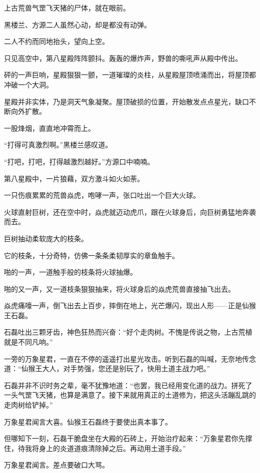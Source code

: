 
\begin{this_body}

上古荒兽气罡飞天猪的尸体，就在眼前。

黑楼兰、方源二人虽然心动，却是都没有动弹。

二人不约而同地抬头，望向上空。

只见高空中，第八星殿阵阵颤抖。轰轰的爆炸声，野兽的嘶吼声从殿中传出。

砰的一声巨响，星殿狠狠一颤，一道璀璨的炎柱，从星殿屋顶喷涌而出，将屋顶都冲破一个大洞。

星殿并非实体，乃是洞天气象凝聚。屋顶破损的位置，开始散发点点星光，缺口不断向外扩散。

一股烽烟，直直地冲霄而上。

“打得可真激烈啊。”黑楼兰感叹道。

“打吧，打吧，打得越激烈越好。”方源口中喃喃。

第八星殿中，一片狼藉，双方激斗如火如荼。

一只伤痕累累的荒兽焱虎，咆哮一声，张口吐出一个巨大火球。

火球直射巨树，还在空中时，焱虎就迈动虎爪，跟在火球身后，向巨树勇猛地奔袭而去。

巨树抽动柔软庞大的枝条。

它的枝条，十分奇特，仿佛一条条柔韧厚实的章鱼触手。

啪的一声，一道触手般的枝条将火球抽爆。

啪的又一声，又一道枝条狠狠抽来，将火球身后的焱虎荒兽直接抽飞出去。

焱虎痛嚎一声，倒飞出去上百步，摔倒在地上，光芒爆闪，现出人形——正是仙猴王石磊。

石磊吐出三颗牙齿，神色狂热而兴奋：“好个走肉树。不愧是传说之物，上古荒植就是不同凡响。”

一旁的万象星君，一直在不停的遥遥打出星光攻击。听到石磊的叫喊，无奈地传念道：“仙猴王大人，对手势强，您还是别玩了，快用土道主战力吧。”

石磊并非不识时务之辈，毫不犹豫地道：“也罢，我已经用变化道的战力。拼死了一头气罡飞天猪，也算是满意了。接下来就用真正的土道修为，把这头活蹦乱跳的走肉树给铲掉。”

万象星君闻言大喜。仙猴王石磊终于要使出真本事了。

但哪知下一刻，石磊干脆盘坐在大殿的石砖上，开始治疗起来：“万象星君你先撑住，待我将身上的炎道道痕清除掉之后。再动用土道手段。”

万象星君闻言。差点要破口大骂。


\end{this_body}
